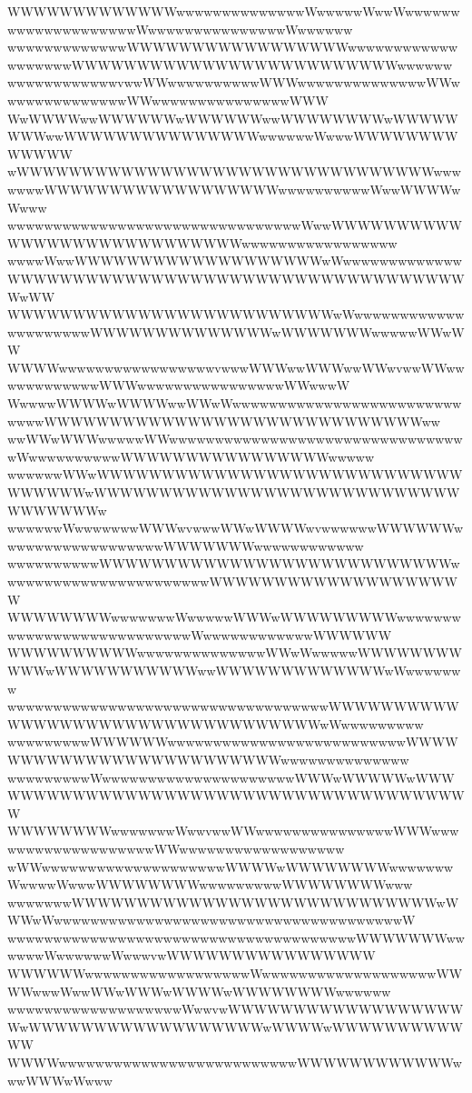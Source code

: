 \documentclass[a4paper]{article}
\begin{document}
\begin{procgrass}{\NabeAzz}
WWWWWWWWWWWWWwwwwwwwwwwwwwwWwwwwwWwwWwwwwwwwwwwwwwwwwwwwwWwwwwwwwwwwwwwwwWwwwwww
wwwwwwwwwwwwwWWWWWWWWWWWWWWWWWwwwwwwwwwwwwwwwwwwwWWWWWWWWWWWWWWWWWWWWWWWWWwwwwww
wwwwwwwwwwwwvwwWWwwwwwwwwwwWWWwwwwwwwwwwwwwwWWwwwwwwwwwwwwwwWWwwwwwwwwwwwwwwwWWW
WwWWWWwwWWWWWWwWWWWWWwwWWWWWWWWwWWWWWWWWwwWWWWWWWWWWWWWWWwwwwwwWwwwWWWWWWWWWWWWW
wWWWWWWWWWWWWWWWWWWWWWWWWWWWWWWWWwwwwwwwWWWWWWWWWWWWWWWWWWwwwwwwwwwwWwwWWWWwWwww
wwwwwwwwwwwwwwwwwwwwwwwwwwwwwwwwWwwWWWWWWWWWWWWWWWWWWWWWWWWWWWWwwwwwwwwwwwwwwwww
wwwwWwwWWWWWWWWWWWWWWWWWWWwWwwwwwwwwwwwwwWWWWWWWWWWWWWWWWWWWWWWWWWWWWWWWWWWWWwWW
WWWWWWWWWWWWWWWWWWWWWWWWWwWwwwwwwwwwwwwwwwwwwwwwWWWWWWWWWWWWWWwWWWWWWWwwwwwWWwWW
WWWWwwwwwwwwwwwwwwwwwvwwwWWWwwWWWwwWWwvwwWWwwwwwwwwwwwwWWWwwwwwwwwwwwwwwwwWWwwwW
WwwwwWWWWwWWWWwwWWwWwwwwwwwwwwwwwwwwwwwwwwwwwwwwwWWWWWWWWWWWWWWWWWWWWWWWWWWWWWww
wwWWwWWWwwwwwWWwwwwwwwwwwwwwwwwwwwwwwwwwwwwwwwwwWwwwwwwwwwwWWWWWWWWWWWWWWWWwwwww
wwwwwwWWwWWWWWWWWWWWWWWWWWWWWWWWWWWWWWWWWWWwWWWWWWWWWWWWWWWWWWWWWWWWWWWWWWWWWWWw
wwwwwwWwwwwwwwWWWwvwwwWWwWWWWwvwwwwwwWWWWWWwwwwwwwwwwwwwwwwwwWWWWWWWwwwwwwwwwwww
wwwwwwwwwwWWWWWWWWWWWWWWWWWWWWWWWWWWWwwwwwwwwwwwwwwwwwwwwwwwWWWWWWWWWWWWWWWWWWWW
WWWWWWWWwwwwwwwWwwwwwWWWwWWWWWWWWWwwwwwwwwwwwwwwwwwwwwwwwwwwwWwwwwwwwwwwwwWWWWWW
WWWWWWWWWWwwwwwwwwwwwwwwWWwWwwwwwWWWWWWWWWWWwWWWWWWWWWWWwwWWWWWWWWWWWWWwWwwwwwww
wwwwwwwwwwwwwwwwwwwwwwwwwwwwwwwwwwwWWWWWWWWWWWWWWWWWWWWWWWWWWWWWWWWWWwWwwwwwwwww
wwwwwwwwwWWWWWWwwwwwwwwwwwwwwwwwwwwwwwwwwWWWWWWWWWWWWWWWWWWWWWWWWWwwwwwwwwwwwwww
wwwwwwwwwWwwwwwwwwwwwwwwwwwwwwwWWWwWWWWWwWWWWWWWWWWWWWWWWWWWWWWWWWWWWWWWWWWWWWWW
WWWWWWWWwwwwwwwWwwvwwWWwwwwwwwwwwwwwwwWWWwwwwwwwwwwwwwwwwwwwWWwwwwwwwwwwwwwwwwww
wWWwwwwwwwwwwwwwwwwwwwwWWWWwWWWWWWWWwwwwwwwWwwwwWwwwWWWWWWWWwwwwwwwwwWWWWWWWWwww
wwwwwwwWWWWWWWWWWWWWWWWWWWWWWWWWWWWwWWWwWwwwwwwwwwwwwwwwwwwwwwwwwwwwwwwwwwwwwwwW
wwwwwwwwwwwwwwwwwwwwwwwwwwwwwwwwwwwwwwWWWWWWWwwwwwwWwwwwwwWwwwvwWWWWWWWWWWWWWWWW
WWWWWWwwwwwwwwwwwwwwwwwwWwwwwwwwwwwwwwwwwwwwWWWWwwwWwwWWwWWWwWWWWwWWWWWWWWwwwwww
wwwwwwwwwwwwwwwwwwwWwwvwWWWWWWWWWWWWWWWWWWWwWWWWWWWWWWWWWWWWWWwWWWWwWWWWWWWWWWWW
WWWWwwwwwwwwwwwwwwwwwwwwwwwwwwWWWWWWWWWWWWwwwWWWwWwww
\end{procgrass}

\newcommand*{\AhoFont}{\usefont{OT1}{cmfr}{m}{it}\LARGE}
\end{document}
